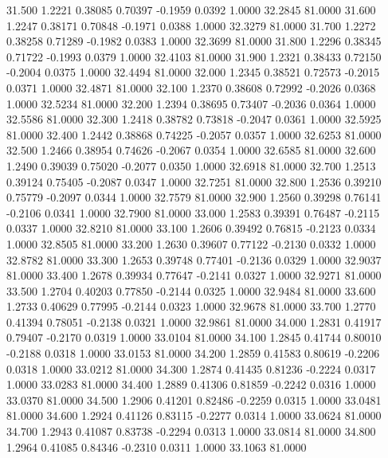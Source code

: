   31.500   1.2221   0.38085   0.70397  -0.1959   0.0392   1.0000  32.2845  81.0000
  31.600   1.2247   0.38171   0.70848  -0.1971   0.0388   1.0000  32.3279  81.0000
  31.700   1.2272   0.38258   0.71289  -0.1982   0.0383   1.0000  32.3699  81.0000
  31.800   1.2296   0.38345   0.71722  -0.1993   0.0379   1.0000  32.4103  81.0000
  31.900   1.2321   0.38433   0.72150  -0.2004   0.0375   1.0000  32.4494  81.0000
  32.000   1.2345   0.38521   0.72573  -0.2015   0.0371   1.0000  32.4871  81.0000
  32.100   1.2370   0.38608   0.72992  -0.2026   0.0368   1.0000  32.5234  81.0000
  32.200   1.2394   0.38695   0.73407  -0.2036   0.0364   1.0000  32.5586  81.0000
  32.300   1.2418   0.38782   0.73818  -0.2047   0.0361   1.0000  32.5925  81.0000
  32.400   1.2442   0.38868   0.74225  -0.2057   0.0357   1.0000  32.6253  81.0000
  32.500   1.2466   0.38954   0.74626  -0.2067   0.0354   1.0000  32.6585  81.0000
  32.600   1.2490   0.39039   0.75020  -0.2077   0.0350   1.0000  32.6918  81.0000
  32.700   1.2513   0.39124   0.75405  -0.2087   0.0347   1.0000  32.7251  81.0000
  32.800   1.2536   0.39210   0.75779  -0.2097   0.0344   1.0000  32.7579  81.0000
  32.900   1.2560   0.39298   0.76141  -0.2106   0.0341   1.0000  32.7900  81.0000
  33.000   1.2583   0.39391   0.76487  -0.2115   0.0337   1.0000  32.8210  81.0000
  33.100   1.2606   0.39492   0.76815  -0.2123   0.0334   1.0000  32.8505  81.0000
  33.200   1.2630   0.39607   0.77122  -0.2130   0.0332   1.0000  32.8782  81.0000
  33.300   1.2653   0.39748   0.77401  -0.2136   0.0329   1.0000  32.9037  81.0000
  33.400   1.2678   0.39934   0.77647  -0.2141   0.0327   1.0000  32.9271  81.0000
  33.500   1.2704   0.40203   0.77850  -0.2144   0.0325   1.0000  32.9484  81.0000
  33.600   1.2733   0.40629   0.77995  -0.2144   0.0323   1.0000  32.9678  81.0000
  33.700   1.2770   0.41394   0.78051  -0.2138   0.0321   1.0000  32.9861  81.0000
  34.000   1.2831   0.41917   0.79407  -0.2170   0.0319   1.0000  33.0104  81.0000
  34.100   1.2845   0.41744   0.80010  -0.2188   0.0318   1.0000  33.0153  81.0000
  34.200   1.2859   0.41583   0.80619  -0.2206   0.0318   1.0000  33.0212  81.0000
  34.300   1.2874   0.41435   0.81236  -0.2224   0.0317   1.0000  33.0283  81.0000
  34.400   1.2889   0.41306   0.81859  -0.2242   0.0316   1.0000  33.0370  81.0000
  34.500   1.2906   0.41201   0.82486  -0.2259   0.0315   1.0000  33.0481  81.0000
  34.600   1.2924   0.41126   0.83115  -0.2277   0.0314   1.0000  33.0624  81.0000
  34.700   1.2943   0.41087   0.83738  -0.2294   0.0313   1.0000  33.0814  81.0000
  34.800   1.2964   0.41085   0.84346  -0.2310   0.0311   1.0000  33.1063  81.0000
